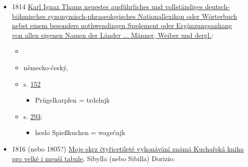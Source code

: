 \begin{itemize}
\begin{itemize}
    \begin{itemize}
    \tightlist
    \item
      báseň "Nemjrnost w gidle ženské hanácké osoby" (Nemírnost v jídle
      ženské hanácké osoby.)
    \item
      holčičce je špatně a popisuje mamince co všechno snědla. nakonec
      přijede doktor z Jevíčka a udělá jí klistýr
    \item
      10. Potom na wečeřo wagec randliček Belo gich gen dwanact, a
      trdelniček Masné a slaďočké, což mě od kmotřečke přenesl
      stréček.``
    \end{itemize}
  \item
    psal to už kolem roku 1805, hlavně hanácký a valašský prostředí
  \end{itemize}
\item
  1814
  \href{https://ndk.cz/uuid/uuid:4672a240-c28c-11dc-9931-000d606f5dc6}{Karl
  Ignaz Thams neuestes ausführliches und vollständiges
  deutsch-böhmisches synonymisch-phraseologisches Nationallexikon oder
  Wörterbuch nebst einem besonders nothwendingen Suplement oder
  Ergänzungsanhang von allen eigenen Namen der Länder ... Männer, Weiber
  und dergl.}:

  \begin{itemize}
  \tightlist
  \item
  \item
     německo-český,
  \item
    s.
    \href{https://ndk.cz/uuid/uuid:4672a240-c28c-11dc-9931-000d606f5dc6}{152}

    \begin{itemize}
    \tightlist
    \item
      Prügelkarpfen = trdelnjk
    \end{itemize}
  \item
    s.
    \href{https://ndk.cz/uuid/uuid:9b4f95a7-eb8b-4008-8023-15cc5563f0ed}{293}:

    \begin{itemize}
    \tightlist
    \item
      heslo Spießkuchen = wagečnjk
    \end{itemize}
  \end{itemize}
\item
  1816 (nebo 1805?)
  \href{https://books.google.cz/books?id=7SZjAAAAcAAJ&hl=cs&pg=PA227\#v=onepage&q&f=false}{Moje
  skrz čtyřicetileté vykonávání známá Kuchařská kniha pro velké i menší
  tabule}, Sibylla (nebo Sibilla) Dorizio:


\end{itemize}
